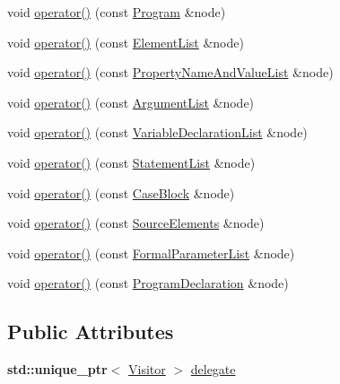 \begin{DoxyCompactItemize}
void \hyperlink{struct_delegate_vistor_ab91cc9d94f2bf10b0f971bd611e4c342}{operator()} (const \hyperlink{struct_program}{Program} \&node)
\item 
void \hyperlink{struct_delegate_vistor_afbce8eda3e6024acaded090bd1f148b4}{operator()} (const \hyperlink{struct_element_list}{Element\+List} \&node)
\item 
void \hyperlink{struct_delegate_vistor_a18de913edc44f9b11aab5ec2ac272fe8}{operator()} (const \hyperlink{struct_property_name_and_value_list}{Property\+Name\+And\+Value\+List} \&node)
\item 
void \hyperlink{struct_delegate_vistor_a99f4276c3d75f0fcd53741597c189378}{operator()} (const \hyperlink{struct_argument_list}{Argument\+List} \&node)
\item 
void \hyperlink{struct_delegate_vistor_a7f00435b263aec84f75be98b4edd13ac}{operator()} (const \hyperlink{struct_variable_declaration_list}{Variable\+Declaration\+List} \&node)
\item 
void \hyperlink{struct_delegate_vistor_a0b78d3d5abbfa16d8226921be3f55054}{operator()} (const \hyperlink{struct_statement_list}{Statement\+List} \&node)
\item 
void \hyperlink{struct_delegate_vistor_a91394d58817ec830a5db0067a28652ce}{operator()} (const \hyperlink{struct_case_block}{Case\+Block} \&node)
\item 
void \hyperlink{struct_delegate_vistor_ae560ab3bc7ab18aa5253dc3ffec0f441}{operator()} (const \hyperlink{struct_source_elements}{Source\+Elements} \&node)
\item 
void \hyperlink{struct_delegate_vistor_a1750f5ef93af97d30588fa78d9382077}{operator()} (const \hyperlink{struct_formal_parameter_list}{Formal\+Parameter\+List} \&node)
\item 
void \hyperlink{struct_delegate_vistor_af8a064f7e3fd7f974f6daece692f3685}{operator()} (const \hyperlink{struct_program_declaration}{Program\+Declaration} \&node)
\end{DoxyCompactItemize}
\subsection*{Public Attributes}
\begin{DoxyCompactItemize}
\item 
\textbf{ std\+::unique\+\_\+ptr}$<$ \hyperlink{struct_visitor}{Visitor} $>$ \hyperlink{struct_delegate_vistor_a44c9e8b830bb102fde7b6203ce9bfdbf}{delegate}
\end{DoxyCompactItemize}


